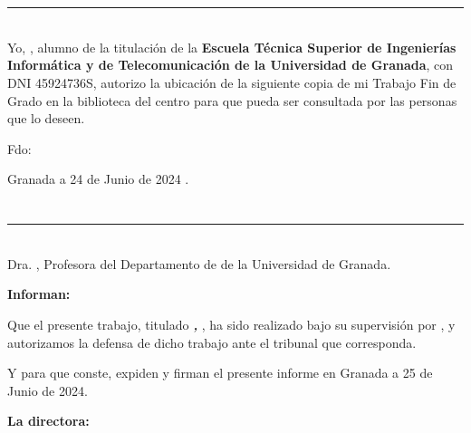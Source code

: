 \chapter*{}
\thispagestyle{empty}


\noindent\rule[-1ex]{\textwidth}{2pt}\\[4.5ex]

Yo, \textbf{\myName}, alumno de la titulación \myDegree de la \textbf{Escuela Técnica Superior
de Ingenierías Informática y de Telecomunicación de la Universidad de Granada}, con DNI 45924736S, autorizo la
ubicación de la siguiente copia de mi Trabajo Fin de Grado en la biblioteca del centro para que pueda ser
consultada por las personas que lo deseen.

\vspace{6cm}

\noindent Fdo: \myName

\vspace{2cm}

\begin{flushright}
Granada a 24 de Junio de 2024 .
\end{flushright}


\chapter*{}
\thispagestyle{empty}

\noindent\rule[-1ex]{\textwidth}{2pt}\\[4.5ex]

Dra. \textbf{\myProf}, Profesora del Departamento de \myDepartment de la Universidad de Granada.


\vspace{0.5cm}

\textbf{Informan:}

\vspace{0.5cm}

Que el presente trabajo, titulado \textit{\textbf{\myTitle, \mySubTitle}},
ha sido realizado bajo su supervisión por \textbf{\myName}, y autorizamos la defensa de dicho trabajo ante el tribunal que corresponda.

\vspace{0.5cm}

Y para que conste, expiden y firman el presente informe en Granada a 25 de Junio de 2024.

\vspace{1cm}

\textbf{La directora:}

\vspace{5cm}

